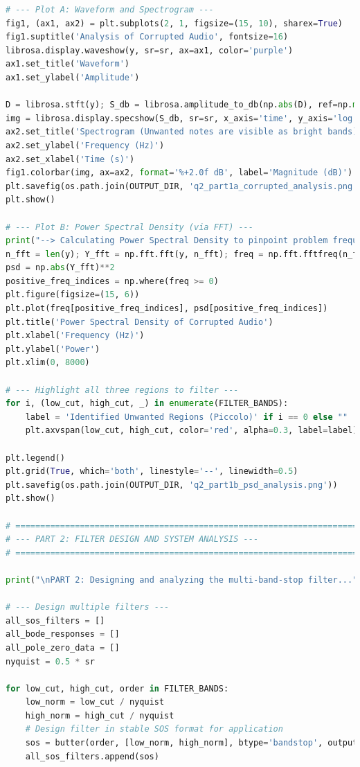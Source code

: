 \documentclass[11pt, a4paper]{article}
\begin{document}
\begin{lstlisting}[language=Python, caption={Python script for Question 2.}]
# --- Plot A: Waveform and Spectrogram ---
fig1, (ax1, ax2) = plt.subplots(2, 1, figsize=(15, 10), sharex=True)
fig1.suptitle('Analysis of Corrupted Audio', fontsize=16)
librosa.display.waveshow(y, sr=sr, ax=ax1, color='purple')
ax1.set_title('Waveform')
ax1.set_ylabel('Amplitude')

D = librosa.stft(y); S_db = librosa.amplitude_to_db(np.abs(D), ref=np.max)
img = librosa.display.specshow(S_db, sr=sr, x_axis='time', y_axis='log', ax=ax2)
ax2.set_title('Spectrogram (Unwanted notes are visible as bright bands)')
ax2.set_ylabel('Frequency (Hz)')
ax2.set_xlabel('Time (s)')
fig1.colorbar(img, ax=ax2, format='%+2.0f dB', label='Magnitude (dB)')
plt.savefig(os.path.join(OUTPUT_DIR, 'q2_part1a_corrupted_analysis.png'))
plt.show()

# --- Plot B: Power Spectral Density (via FFT) ---
print("--> Calculating Power Spectral Density to pinpoint problem frequencies...")
n_fft = len(y); Y_fft = np.fft.fft(y, n_fft); freq = np.fft.fftfreq(n_fft, d=1/sr)
psd = np.abs(Y_fft)**2
positive_freq_indices = np.where(freq >= 0)
plt.figure(figsize=(15, 6))
plt.plot(freq[positive_freq_indices], psd[positive_freq_indices])
plt.title('Power Spectral Density of Corrupted Audio')
plt.xlabel('Frequency (Hz)')
plt.ylabel('Power')
plt.xlim(0, 8000)

# --- Highlight all three regions to filter ---
for i, (low_cut, high_cut, _) in enumerate(FILTER_BANDS):
    label = 'Identified Unwanted Regions (Piccolo)' if i == 0 else ""
    plt.axvspan(low_cut, high_cut, color='red', alpha=0.3, label=label)

plt.legend()
plt.grid(True, which='both', linestyle='--', linewidth=0.5)
plt.savefig(os.path.join(OUTPUT_DIR, 'q2_part1b_psd_analysis.png'))
plt.show()

# ============================================================================
# --- PART 2: FILTER DESIGN AND SYSTEM ANALYSIS ---
# ============================================================================

print("\nPART 2: Designing and analyzing the multi-band-stop filter...")

# --- Design multiple filters ---
all_sos_filters = []
all_bode_responses = []
all_pole_zero_data = []
nyquist = 0.5 * sr

for low_cut, high_cut, order in FILTER_BANDS:
    low_norm = low_cut / nyquist
    high_norm = high_cut / nyquist
    # Design filter in stable SOS format for application
    sos = butter(order, [low_norm, high_norm], btype='bandstop', output='sos')
    all_sos_filters.append(sos)
    

\end{lstlisting}
\end{document}
